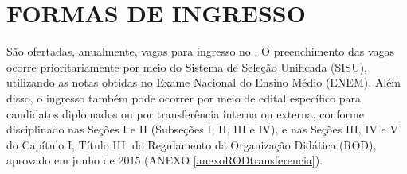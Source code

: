 \section{FORMAS DE INGRESSO}

São ofertadas, anualmente, \NUMVAGAS{} vagas para ingresso no \NOMECURSO. O preenchimento das vagas ocorre prioritariamente por meio do Sistema de Seleção Unificada (SISU), utilizando as notas obtidas no Exame Nacional do Ensino Médio (ENEM). Além disso, o ingresso também pode ocorrer por meio de edital específico para candidatos diplomados ou por transferência interna ou externa, conforme disciplinado nas Seções I e II (Subseções I, II, III e IV), e nas Seções III, IV e V do Capítulo I, Título III, do Regulamento da Organização Didática (ROD), aprovado em junho de 2015 (ANEXO \ref{anexoRODtransferencia}).

